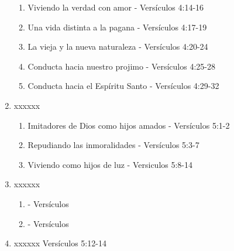 \documentclass[9pt,letterpaper]{article}
\begin{document}
\begin{enumerate}
\begin{enumerate}
			\item Viviendo la verdad con amor - Versículos 4:14-16
			\item Una vida distinta a la pagana - Versículos 4:17-19
			\item La vieja y la nueva naturaleza - Versículos 4:20-24
			\item Conducta hacia nuestro projimo - Versículos 4:25-28
			\item Conducta hacia el Espíritu Santo - Versículos 4:29-32
		\end{enumerate}
		\item xxxxxx
		\begin{enumerate}
			\item Imitadores de Dios como hijos amados - Versículos 5:1-2
			\item Repudiando las inmoralidades - Versículos 5:3-7
			\item Viviendo como hijos de luz - Versiculos 5:8-14
			
		\end{enumerate}
		\item xxxxxx
		\begin{enumerate}
			\item  - Versículos 
			\item  - Versículos 
		\end{enumerate}
		\item xxxxxx Versículos 5:12-14
	\end{enumerate}
\end{document}
